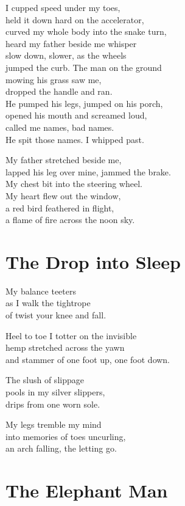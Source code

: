 \documentclass[twoside,10pt]{book}
\begin{document}
I cupped speed under my toes,\\
held it down hard on the accelerator,\\
curved my whole body into the snake turn,\\
heard my father beside me whisper\\
slow down, slower, as the wheels\\
jumped the curb. The man on the ground\\
mowing his grass saw me,\\
dropped the handle and ran.\\
He pumped his legs, jumped on his porch,\\
opened his mouth and screamed loud,\\
called me names, bad names.\\
He spit those names. I whipped past.

My father stretched beside me,\\
lapped his leg over mine, jammed the brake.\\
My chest bit into the steering wheel.\\
My heart flew out the window,\\
a red bird feathered in flight,\\
a flame of fire across the noon sky.


\clearpage
\section{The Drop into Sleep}

My balance teeters\\
as I walk the tightrope\\
of twist your knee and fall.

Heel to toe I totter on the invisible\\
hemp stretched across the yawn\\
and stammer of one foot up, one foot down.

The slush of slippage\\
pools in my silver slippers,\\
drips from one worn sole.

My legs tremble my mind\\
into memories of toes uncurling,\\
an arch falling, the letting go.


\clearpage
\section{The Elephant Man}
\end{document}
